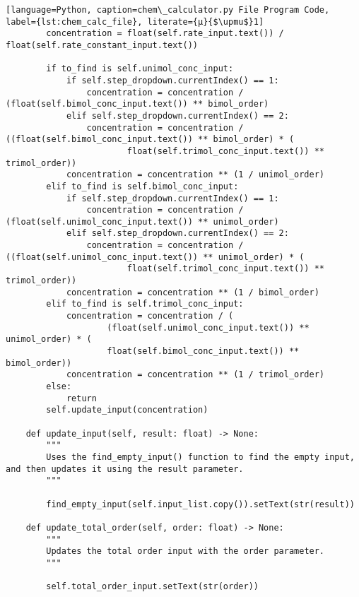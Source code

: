 \begin{lstlisting}[language=Python, caption=chem\_calculator.py File Program Code, label={lst:chem_calc_file}, literate={μ}{$\upmu$}1]
        concentration = float(self.rate_input.text()) / float(self.rate_constant_input.text())

        if to_find is self.unimol_conc_input:
            if self.step_dropdown.currentIndex() == 1:
                concentration = concentration / (float(self.bimol_conc_input.text()) ** bimol_order)
            elif self.step_dropdown.currentIndex() == 2:
                concentration = concentration / ((float(self.bimol_conc_input.text()) ** bimol_order) * (
                        float(self.trimol_conc_input.text()) ** trimol_order))
            concentration = concentration ** (1 / unimol_order)
        elif to_find is self.bimol_conc_input:
            if self.step_dropdown.currentIndex() == 1:
                concentration = concentration / (float(self.unimol_conc_input.text()) ** unimol_order)
            elif self.step_dropdown.currentIndex() == 2:
                concentration = concentration / ((float(self.unimol_conc_input.text()) ** unimol_order) * (
                        float(self.trimol_conc_input.text()) ** trimol_order))
            concentration = concentration ** (1 / bimol_order)
        elif to_find is self.trimol_conc_input:
            concentration = concentration / (
                    (float(self.unimol_conc_input.text()) ** unimol_order) * (
                    float(self.bimol_conc_input.text()) ** bimol_order))
            concentration = concentration ** (1 / trimol_order)
        else:
            return
        self.update_input(concentration)

    def update_input(self, result: float) -> None:
        """
        Uses the find_empty_input() function to find the empty input, and then updates it using the result parameter.
        """

        find_empty_input(self.input_list.copy()).setText(str(result))

    def update_total_order(self, order: float) -> None:
        """
        Updates the total order input with the order parameter.
        """

        self.total_order_input.setText(str(order))
\end{lstlisting}
